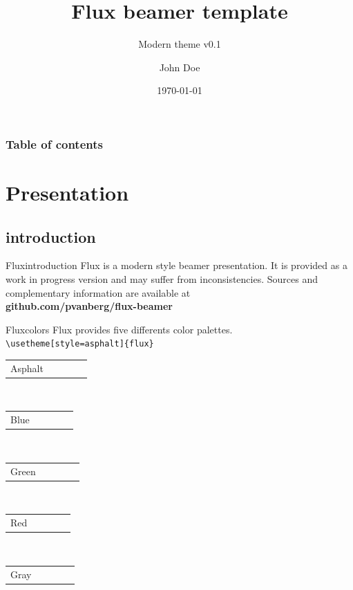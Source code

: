 \documentclass[9pt]{beamer}
\title{Flux beamer template}
\subtitle{Modern theme v0.1}
\author{John Doe}
\institute{Institute, location}
\date{\today}
\begin{document}
\titlepage

\begin{frame}
 \frametitle{Table of contents}
 \tableofcontents
\end{frame}

\section{Presentation}

\subsection{introduction}

\begin{frame}{Flux}{introduction}
	\justifying
 Flux is a modern style beamer presentation. It is provided as a work in progress version and may suffer from inconsistencies. Sources and complementary information are available at\\[0.3cm]
 	\centering\textbf{github.com/pvanberg/flux-beamer}
\end{frame}

\def\beamer@mytheme@style{green}
\begin{frame}[fragile]{Flux}{colors}
	\centering
	Flux provides five differents color palettes.\\
	\verb+\usetheme[style=asphalt]{flux}+\\[0.8cm]
	\newcommand{\colorRow}[1]{
	\begin{tabular}{p{4cm}cccc}
	#1 & \cellcolor{primary}\hspace*{1cm} &\cellcolor{primaryLight}\hspace*{1cm}&\cellcolor{secondary}\hspace*{1cm}&\cellcolor{tertiary}\hspace*{1cm}\\
 	\end{tabular}
 	}
 	\colorRow{Asphalt}\\[0.3cm]
 	\colorRow{Blue}\\[0.3cm]
 	\colorRow{Green}\\[0.3cm]
 	\colorRow{Red}\\[0.3cm]
 	\colorRow{Gray}\\[0.3cm]
\end{frame}
\end{document}
